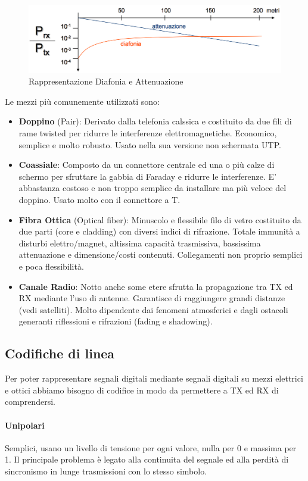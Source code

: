 \documentclass[12pt]{article}
\begin{document}
\begin{figure}[!hp]
  \centering
  \includegraphics[width=\linewidth]{images/diaf_att.png}
  \caption{Rappresentazione Diafonia e Attenuazione}
  \label{fig:diaf_att}
\end{figure}
Le mezzi più comunemente utilizzati sono:
\begin{itemize}
  \item \textbf{Doppino} (Pair): Derivato dalla telefonia calssica e costituito da due fili di rame twisted per ridurre le interferenze elettromagnetiche. Economico, semplice e molto robusto. Usato nella sua versione non schermata UTP.
  \item \textbf{Coassiale}: Composto da un connettore centrale ed una o più calze di schermo per sfruttare la gabbia di Faraday e ridurre le interferenze. E' abbastanza costoso e non troppo semplice da installare ma più veloce del doppino. Usato molto con il connettore a T.
  \item \textbf{Fibra Ottica} (Optical fiber): Minuscolo e flessibile filo di vetro costituito da due parti (core e cladding) con diversi indici di rifrazione. Totale immunità a disturbi elettro/magnet, altissima capacità trasmissiva, bassissima attenuazione e dimensione/costi contenuti. Collegamenti non proprio semplici e poca flessibilità.
  \item \textbf{Canale Radio}: Notto anche some etere sfrutta la propagazione tra TX ed RX mediante l'uso di antenne. Garantisce di raggiungere grandi distanze (vedi satelliti). Molto dipendente dai fenomeni atmosferici e dagli ostacoli generanti riflessioni e rifrazioni (fading e shadowing).
\end{itemize}

\subsection{Codifiche di linea}
Per poter rappresentare segnali digitali mediante segnali digitali su mezzi elettrici e ottici abbiamo bisogno di codifice in modo da permettere a TX ed RX di comprendersi.
\paragraph{Unipolari}
Semplici, usano un livello di tensione per ogni valore, nulla per 0 e massima per 1. Il principale problema è legato alla continuita del segnale ed alla perdità di sincronismo in lunge trasmissioni con lo stesso simbolo.
\end{document}
